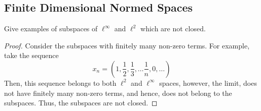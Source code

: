 \subsection{Finite Dimensional Normed Spaces}

\begin{question}
    Give examples of subspaces of $\ell^\infty$ and $\ell^2$ which are not closed.
    \label{section2.4}
\end{question}
\begin{proof}
    Consider the subspaces with finitely many non-zero terms. For example, take the sequence 
    \[x_n = \left(1 , \frac{1}{2} , \frac{1}{3} , \ldots \frac{1}{n} , 0 , \ldots  \right)\]
    Then, this sequence belongs to both $\ell^2$ and $\ell^ \infty$ spaces, however, the limit, does not have finitely many non-zero terms, and hence, does not belong to the subspaces. Thus, the subspaces are not closed.
\end{proof}
